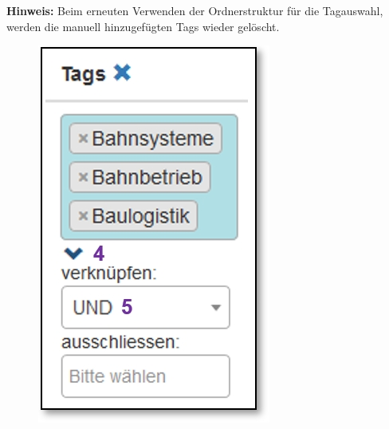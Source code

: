 \vspace{\baselineskip}

\textbf{Hinweis:} Beim erneuten Verwenden der Ordnerstruktur für die Tagauswahl, werden die manuell hinzugefügten Tags wieder gelöscht.

\vspace{\baselineskip}

\begin{figure}   %
  \vspace{-35pt}      %
  \begin{center}
    \includegraphics[width=.9\linewidth]{../chapters/11_Dokumentenablage/pictures/dok_Tags_erwEinstellungen.jpg}
  \end{center}
  \vspace{-20pt}
  \vspace{-10pt}
\end{figure}

